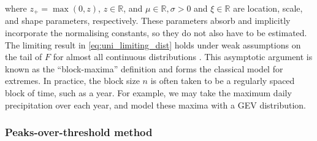 \documentclass{article}
\numberwithin{equation}{section}
\begin{document}
where $z_+ = \max(0, z)$, $z \in \mathbb{R}$, and $\mu \in \mathbb{R}, \sigma > 0$ and $\xi \in \mathbb{R}$ are location, scale, and shape parameters, respectively. 
These parameters absorb and implicitly incorporate the normalising constants, so they do not also have to be estimated. 
The limiting result in \ref{eq:uni_limiting_dist} holds under weak assumptions on the tail of $F$ for almost all continuous distributions \cite{Dupuis2023}. 
This asymptotic argument is known as the ``block-maxima'' definition and forms the classical model for extremes. 
In practice, the block size $n$ is often taken to be a regularly spaced block of time, such as a year. %
For example, we may take the maximum daily precipitation over each year, and model these maxima with a GEV distribution.

\subsubsection{Peaks-over-threshold method} \label{subsubsec:pot}
\end{document}
